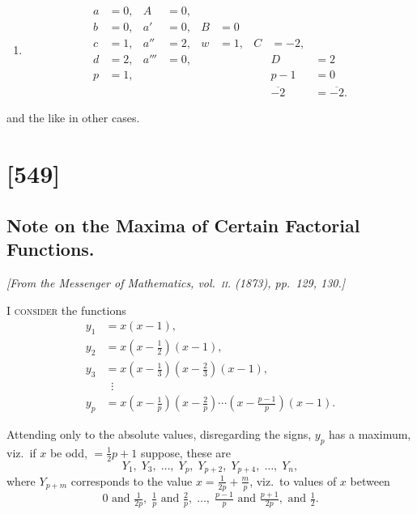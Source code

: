 \documentclass[11pt,a4paper]{article}
\theoremstyle{plain}
\theoremstyle{definition}
\begin{document}
\begin{enumerate}
And so if instead of the tubular figure, annulus with three radii, we had a
tubular figure, annulus with diameter, then

\item
\begin{align*}
a &= 0, & A &= 0, \\
b &= 0, & a' &= 0, & B &= 0 \\
c &= 1, & a'' &= 2, & w &= 1, & C &= -2, \\
d &= 2, & a''' &= 0, & & & & D &= 2 \\
p &= 1, & & & & & & p - 1 &= 0 \\[2pt]
& & & & & & & \overline{-2} &= \overline{-2}.
\end{align*}
\end{enumerate}

and the like in other cases.

\clearpage

\section{[549]}
\subsection{Note on the Maxima of Certain Factorial Functions.}

\begin{center}
\textit{[From the Messenger of Mathematics, vol.~\textsc{ii}. (1873), pp.~129, 130.]}
\end{center}

\textsc{I consider} the functions
\begin{align*}
y_1 &= x(x-1), \\
y_2 &= x(x-\tfrac{1}{2})(x-1), \\
y_3 &= x(x-\tfrac{1}{3})(x-\tfrac{2}{3})(x-1), \\
&\;\;\vdots \\
y_p &= x\left(x - \tfrac{1}{p}\right)\left(x - \tfrac{2}{p}\right)\cdots\left(x - \tfrac{p-1}{p}\right)(x-1).
\end{align*}

Attending only to the absolute values, disregarding the signs, $y_p$ has a maximum,
viz.\ if $x$ be odd, $= \tfrac{1}{2}p + 1$ suppose, these are
\[
Y_1, \;Y_3, \;\ldots, \;Y_p, \;Y_{p+2}, \;Y_{p+4}, \;\ldots, \;Y_n,
\]
where $Y_{p+m}$ corresponds to the value $x = \tfrac{1}{2p} + \tfrac{m}{p}$, viz.\ to values of $x$ between
\[
0 \text{ and } \tfrac{1}{2p}, \; \tfrac{1}{p} \text{ and } \tfrac{2}{p}, \; \ldots, \; \tfrac{p-1}{p} \text{ and } \tfrac{p+1}{2p}, \text{ and } \tfrac{1}{2}.
\]
\end{document}
